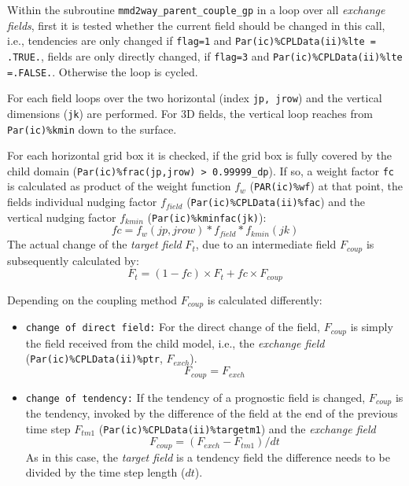 \documentclass[11pt,twoside]{article}
\begin{document}
Within the subroutine \verb|mmd2way_parent_couple_gp| in  a loop over all
{\it exchange fields}, first it is tested whether the current field should be
changed in this call, i.e., tendencies are only changed if 
\verb|flag=1| and \verb|Par(ic)%CPLData(ii)%lte = .TRUE.|, fields are  
only directly changed, if \verb|flag=3| and 
\verb|Par(ic)%CPLData(ii)%lte =.FALSE.|. Otherwise the loop is cycled.

For each field loops over the two horizontal (index \verb|jp, jrow|) and the
vertical 
dimensions (\verb|jk|) are performed. For 3D fields, the vertical loop reaches
from \verb|Par(ic)%kmin| down to the surface. 

For each horizontal grid box it is checked, if the grid box is fully covered
by the 
child domain (\verb|Par(ic)%frac(jp,jrow) > 0.99999_dp|). If so,
a weight factor \verb|fc| is calculated as product of the weight function $f_w$
(\verb|PAR(ic)%wf|) at that point, the fields individual nudging factor
$f_{field}$ (\verb|Par(ic)%CPLData(ii)%fac|) and the vertical nudging
factor $f_{kmin}$ (\verb|Par(ic)%kminfac(jk)|):
\begin{equation}
fc = f_w(jp,jrow) * f_{field} * f_{kmin}(jk)
\end{equation}
The actual change of the {\it target field} $F_{t}$, due to an intermediate field $F_{coup}$ is subsequently calculated by:
\begin{equation}
F_t  = (1 - fc) \times F_t + fc \times F_{coup}
\end{equation}

Depending on the coupling method $F_{coup}$ is calculated differently:
\begin{itemize}
\item {\tt change of direct field:} For the direct change of the field, 
$F_{coup}$ is simply the field received from the child model, i.e., the {\it
exchange field}
(\verb|Par(ic)%CPLData(ii)%ptr|, $F_{exch}$).
\begin{equation}
F_{coup} = F_{exch}
\end{equation}

\item {\tt change of tendency:}
If the tendency of a prognostic field is changed, $F_{coup}$ is the
tendency, invoked by the difference of the field at the end of the previous
time step $F_{tm1}$ (\verb|Par(ic)%CPLData(ii)%targetm1|) and the
{\it exchange field} 
\begin{equation}
F_{coup} = ( F_{exch} - F_{tm1} ) / dt
\end{equation}
As in this case, the {\it target field} is a tendency field the difference
needs to be divided by the time step length ($dt$).
\end{itemize}
\end{document}
